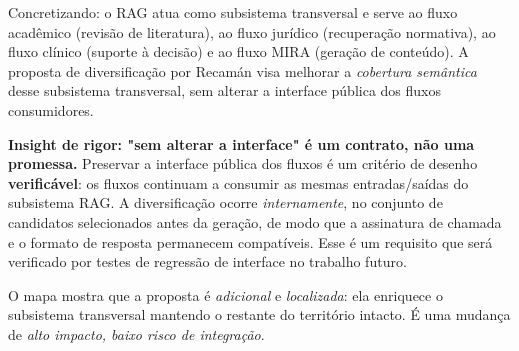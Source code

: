  Concretizando: o RAG atua como subsistema transversal e serve ao fluxo
acadêmico (revisão de literatura), ao fluxo jurídico (recuperação normativa), ao
fluxo clínico (suporte à decisão) e ao fluxo MIRA (geração de conteúdo). A proposta
de diversificação por Recamán visa melhorar a \emph{cobertura semântica} desse
subsistema transversal, sem alterar a interface pública dos fluxos consumidores.

 \textbf{Insight de rigor: "sem alterar a interface" é um contrato, não
uma promessa.} Preservar a interface pública dos fluxos é um critério de desenho
\textbf{verificável}: os fluxos continuam a consumir as mesmas entradas/saídas do
subsistema RAG. A diversificação ocorre \emph{internamente}, no conjunto de
candidatos selecionados antes da geração, de modo que a assinatura de chamada e o
formato de resposta permanecem compatíveis. Esse é um requisito que será
verificado por testes de regressão de interface no trabalho futuro.

\begin{pontochave}
O mapa mostra que a proposta é \emph{adicional} e \emph{localizada}: ela enriquece
o subsistema transversal mantendo o restante do território intacto. É uma
mudança de \emph{alto impacto, baixo risco de integração}.
\end{pontochave}
